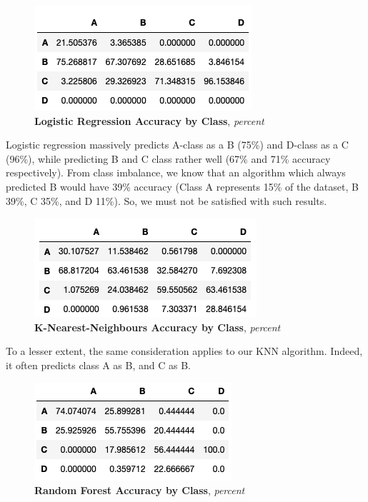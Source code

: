 \documentclass[12pt]{report}
\begin{document}
\begin{figure}[h!]
\centering
\includegraphics[scale=0.7]{logreg_benchmark.png}
\caption{\textbf{Logistic Regression Accuracy by Class}, \textit{percent}}
\label{fig:logreg_benchmark}
\end{figure}

Logistic regression massively predicts A-class as a B (75\%) and D-class as a C (96\%), while predicting B and C class rather well (67\% and 71\% accuracy respectively). From class imbalance, we know that an algorithm which always predicted B would have 39\% accuracy (Class A represents 15\% of the dataset, B 39\%, C 35\%, and D 11\%). So, we must not be satisfied with such results.

\begin{figure}[h!]
\centering
\includegraphics[scale=0.7]{knn_benchmark.png}
\caption{\textbf{{K-Nearest-Neighbours Accuracy by Class}}, \textit{percent}}
\label{fig:knn_benchmark}
\end{figure}

To a lesser extent, the same consideration applies to our KNN algorithm. Indeed, it often predicts class A as B, and C as B. 

\begin{figure}[h!]
\centering
\includegraphics[scale=0.7]{rf_benchmark.png}
\caption{\textbf{{Random Forest Accuracy by Class}}, \textit{percent}}
\label{fig:rf_benchmark}
\end{figure}
\end{document}
